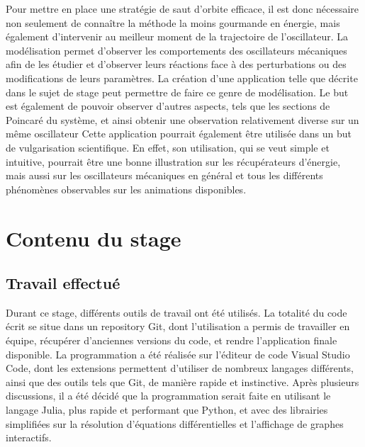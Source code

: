 \documentclass[a4paper, french, 12pt, titlepage]{article}
\begin{document}
Pour mettre en place une stratégie de saut d'orbite efficace, il est donc nécessaire non seulement de connaître la méthode la moins gourmande en énergie, mais également d'intervenir au meilleur moment de la trajectoire de l'oscillateur.
La modélisation permet d'observer les comportements des oscillateurs mécaniques afin de les étudier et d'observer leurs réactions face à des perturbations ou des modifications de leurs paramètres.
La création d'une application telle que décrite dans le sujet de stage peut permettre de faire ce genre de modélisation.
Le but est également de pouvoir observer d'autres aspects, tels que les sections de Poincaré du système, et ainsi obtenir une observation relativement diverse sur un même oscillateur
Cette application pourrait également être utilisée dans un but de vulgarisation scientifique.
En effet, son utilisation, qui se veut simple et intuitive, pourrait être une bonne illustration sur les récupérateurs d'énergie, mais aussi sur les oscillateurs mécaniques en général et tous les différents phénomènes observables sur les animations disponibles.



\newpage

\section{Contenu du stage}


\subsection{Travail effectué}


Durant ce stage, différents outils de travail ont été utilisés.
La totalité du code écrit se situe dans un repository Git, dont l'utilisation a permis de travailler en équipe, récupérer d'anciennes versions du code, et rendre l'application finale disponible.
La programmation a été réalisée sur l'éditeur de code Visual Studio Code, dont les extensions permettent d'utiliser de nombreux langages différents, ainsi que des outils tels que Git, de manière rapide et instinctive.
Après plusieurs discussions, il a été décidé que la programmation serait faite en utilisant le langage Julia, plus rapide et performant que Python, et avec des librairies simplifiées sur la résolution d'équations différentielles et l'affichage de graphes interactifs.
\end{document}
